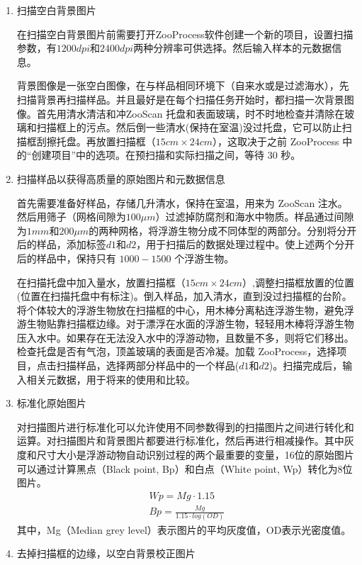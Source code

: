 \begin{enumerate}
\item 扫描空白背景图片

在扫描空白背景图片前需要打开ZooProcess软件创建一个新的项目，设置扫描参数，有$1200dpi$和$2400dpi$两种分辨率可供选择。然后输入样本的元数据信息。

背景图像是一张空白图像，在与样品相同环境下（自来水或是过滤海水），先扫描背景再扫描样品。并且最好是在每个扫描任务开始时，都扫描一次背景图像。首先用清水清洁和冲ZooScan 托盘和表面玻璃，时不时地检查并清除在玻璃和扫描框上的污点。然后倒一些清水(保持在室温)没过托盘，它可以防止扫描框刮擦托盘。再放置扫描框（$15cm \times 24cm$），这取决于之前 ZooProcess 中的“创建项目”中的选项。在预扫描和实际扫描之间，等待 30 秒。

\item 扫描样品以获得高质量的原始图片和元数据信息

首先需要准备好样品，存储几升清水，保持在室温，用来为 ZooScan 注水。然后用筛子（网格间隙为$100\mu m$）过滤掉防腐剂和海水中物质。样品通过间隙为$1mm$和$200\mu m$的两种网格，将浮游生物分成不同体型的两部分。分别将分开后的样品，添加标签$d1$和$d2$，用于扫描后的数据处理过程中。使上述两个分开后的样品中，保持只有 $1000 − 1500$ 个浮游生物。

在扫描托盘中加入量水，放置扫描框（$15cm \times 24cm$）,调整扫描框放置的位置(位置在扫描托盘中有标注)。倒入样品，加入清水，直到没过扫描框的台阶。将个体较大的浮游生物放在扫描框的中心，用木棒分离粘连浮游生物，避免浮游生物贴靠扫描框边缘。对于漂浮在水面的浮游生物，轻轻用木棒将浮游生物压入水中。如果存在无法没入水中的浮游动物，且数量不多，则将它们移出。检查托盘是否有气泡，顶盖玻璃的表面是否冷凝。加载 ZooProcess，选择项目，点击扫描样品，选择两部分样品中的一个样品($d1$和$d2$)。扫描完成后，输入相关元数据，用于将来的使用和比较。

\item 标准化原始图片

对扫描图片进行标准化可以允许使用不同参数得到的扫描图片之间进行转化和运算。对扫描图片和背景图片都要进行标准化，然后再进行相减操作。其中灰度和尺寸大小是浮游动物自动识别过程的两个最重要的变量，16位的原始图片可以通过计算黑点（Black point, Bp）和白点（White point, Wp）转化为8位图片。
\begin{align}
Wp = Mg \cdot 1.15\\
Bp = \frac{Mg}{1.15 \cdot log(OD)}
\end{align}
其中，Mg（Median grey level）表示图片的平均灰度值，OD表示光密度值。

\item 去掉扫描框的边缘，以空白背景校正图片


\end{enumerate}
